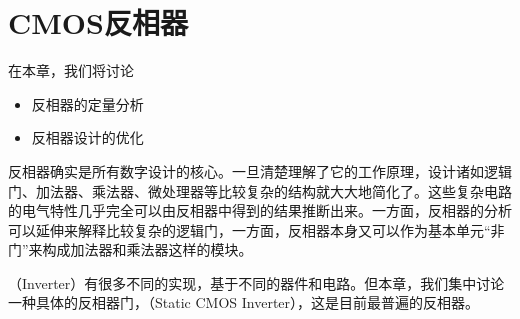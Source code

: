\chapter{CMOS反相器}
在本章，我们将讨论
\begin{itemize}
    \item 反相器的定量分析
    \item 反相器设计的优化
\end{itemize}

反相器确实是所有数字设计的核心。一旦清楚理解了它的工作原理，设计诸如逻辑门、加法器、乘法器、微处理器等比较复杂的结构就大大地简化了。这些复杂电路的电气特性几乎完全可以由反相器中得到的结果推断出来。一方面，反相器的分析可以延伸来解释比较复杂的逻辑门，一方面，反相器本身又可以作为基本单元“非门”来构成加法器和乘法器这样的模块。

（Inverter）有很多不同的实现，基于不同的器件和电路。但本章，我们集中讨论一种具体的反相器门，（Static CMOS Inverter），这是目前最普遍的反相器。





